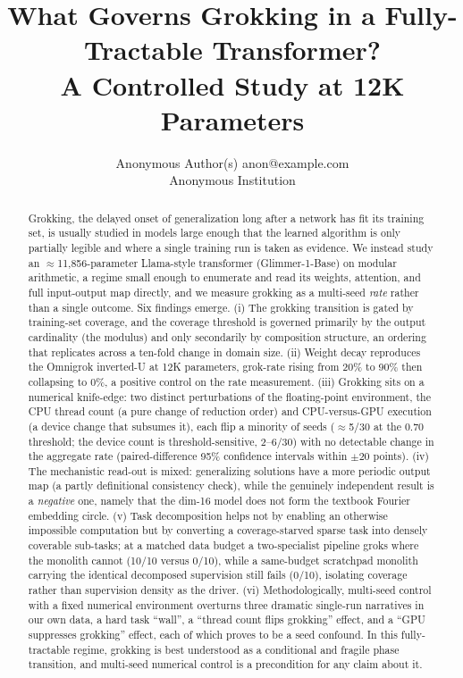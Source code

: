 \documentclass[10pt]{article} %
\title{What Governs Grokking in a Fully-Tractable Transformer?\\ A Controlled Study at 12K Parameters}
\author{\name Anonymous Author(s) \email anon@example.com \\
      \addr Anonymous Institution}
\begin{document}
\maketitle

\begin{abstract}
Grokking, the delayed onset of generalization long after a network has fit its training set, is
usually studied in models large enough that the learned algorithm is only partially legible and
where a single training run is taken as evidence. We instead study an $\approx$11{,}856-parameter
Llama-style transformer (Glimmer-1-Base) on modular arithmetic, a regime small enough to enumerate
and read its weights, attention, and full input-output map directly, and we measure grokking as a
multi-seed \emph{rate} rather than a single outcome. Six findings emerge. (i) The grokking
transition is gated by training-set coverage, and the coverage threshold is governed primarily by
the output cardinality (the modulus) and only secondarily by composition structure, an ordering
that replicates across a ten-fold change in domain size. (ii) Weight decay reproduces the Omnigrok
inverted-U at 12K parameters, grok-rate rising from 20\% to 90\% then collapsing to 0\%, a positive
control on the rate measurement. (iii) Grokking sits on a
numerical knife-edge: two distinct perturbations of the floating-point environment, the CPU thread
count (a pure change of reduction order) and CPU-versus-GPU execution (a device change that subsumes
it), each flip a minority of seeds ($\approx$5/30 at the 0.70 threshold; the device count is
threshold-sensitive, 2--6/30) with no detectable change in the aggregate rate (paired-difference
95\% confidence intervals within $\pm20$ points). (iv) The mechanistic read-out is mixed:
generalizing solutions have a more periodic output map (a partly definitional consistency check),
while the genuinely independent result is a \emph{negative} one, namely that the dim-16 model does
not form the textbook Fourier embedding circle. (v) Task decomposition helps not by enabling an
otherwise impossible computation but by converting a coverage-starved sparse task into densely
coverable sub-tasks; at a matched data budget a two-specialist pipeline groks where the monolith
cannot (10/10 versus 0/10), while a same-budget scratchpad monolith carrying the identical
decomposed supervision still fails (0/10), isolating coverage rather than supervision density as the
driver. (vi) Methodologically, multi-seed
control with a fixed numerical environment overturns three dramatic single-run narratives in our
own data, a hard task ``wall'', a ``thread count flips grokking'' effect, and a ``GPU suppresses
grokking'' effect, each of which proves to be a seed confound. In this fully-tractable regime,
grokking is best understood as a conditional and fragile phase transition, and multi-seed numerical
control is a precondition for any claim about it.
\end{abstract}
\end{document}
